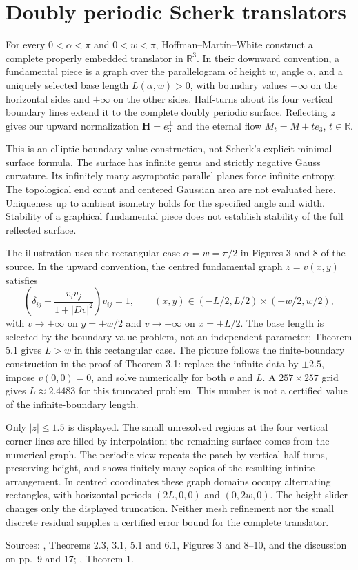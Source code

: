 \chapter{Doubly periodic Scherk translators}\label{sec:catalogue-scherk-translators}
\begin{example}\label{ex:catalogue-scherk-translators}
For every $0<\alpha<\pi$ and $0<w<\pi$, Hoffman--Mart\'in--White construct a complete properly embedded translator in $\mathbb R^3$. In their downward convention, a fundamental piece is a graph over the parallelogram of height $w$, angle $\alpha$, and a uniquely selected base length $L(\alpha,w)>0$, with boundary values $-\infty$ on the horizontal sides and $+\infty$ on the other sides. Half-turns about its four vertical boundary lines extend it to the complete doubly periodic surface. Reflecting $z$ gives our upward normalization $\mathbf H=e_3^\perp$ and the eternal flow $M_t=M+te_3$, $t\in\mathbb R$.

This is an elliptic boundary-value construction, not Scherk's explicit minimal-surface formula. The surface has infinite genus and strictly negative Gauss curvature. Its infinitely many asymptotic parallel planes force infinite entropy. The topological end count and centered Gaussian area are not evaluated here. Uniqueness up to ambient isometry holds for the specified angle and width. Stability of a graphical fundamental piece does not establish stability of the full reflected surface.

The illustration uses the rectangular case $\alpha=w=\pi/2$ in Figures 3 and 8 of the source. In the upward convention, the centred fundamental graph $z=v(x,y)$ satisfies
\[
 \left(\delta_{ij}-\frac{v_i v_j}{1+|Dv|^2}\right)v_{ij}=1,
 \qquad (x,y)\in(-L/2,L/2)\times(-w/2,w/2),
\]
with $v\to+\infty$ on $y=\pm w/2$ and $v\to-\infty$ on $x=\pm L/2$. The base length is selected by the boundary-value problem, not an independent parameter; Theorem 5.1 gives $L>w$ in this rectangular case. The picture follows the finite-boundary construction in the proof of Theorem 3.1: replace the infinite data by $\pm2.5$, impose $v(0,0)=0$, and solve numerically for both $v$ and $L$. A $257\times257$ grid gives $L\approx2.4483$ for this truncated problem. This number is not a certified value of the infinite-boundary length.

Only $|z|\le1.5$ is displayed. The small unresolved regions at the four vertical corner lines are filled by interpolation; the remaining surface comes from the numerical graph. The periodic view repeats the patch by vertical half-turns, preserving height, and shows finitely many copies of the resulting infinite arrangement. In centred coordinates these graph domains occupy alternating rectangles, with horizontal periods $(2L,0,0)$ and $(0,2w,0)$. The height slider changes only the displayed truncation. Neither mesh refinement nor the small discrete residual supplies a certified error bound for the complete translator.

Sources: \cite{CatHMW20}, Theorems 2.3, 3.1, 5.1 and 6.1, Figures 3 and 8--10, and the discussion on pp.~9 and 17; \cite{CatMSTW26}, Theorem 1.
\end{example}

